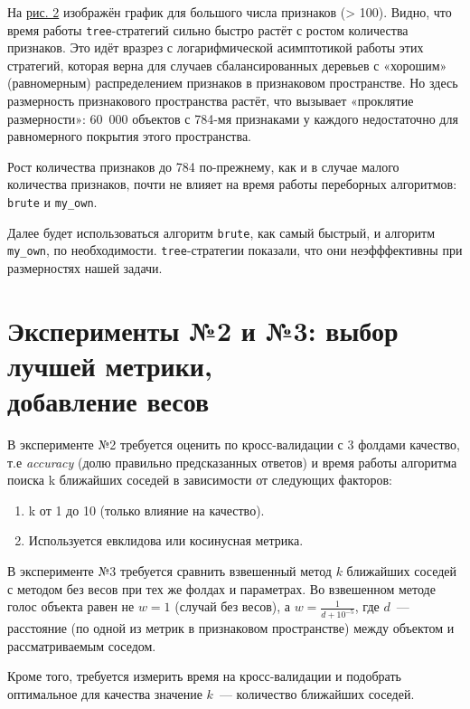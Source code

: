 \documentclass[12pt]{article}
\begin{document}
На \hyperref[fig:1_times-2]{рис. 2} изображён график для большого числа признаков (> 100). Видно, что время работы \verb|tree|-стратегий сильно быстро растёт с ростом количества признаков. Это идёт вразрез с логарифмической асимптотикой работы этих стратегий, которая верна для случаев сбалансированных деревьев с «хорошим» (равномерным) распределением признаков в признаковом пространстве. Но здесь размерность признакового пространства растёт, что вызывает «проклятие размерности»: 60~000 объектов с 784-мя признаками у каждого недостаточно для равномерного покрытия этого пространства.

Рост количества признаков до 784 по-прежнему, как и в случае малого количества признаков, почти не влияет на время работы переборных алгоритмов: \verb|brute| и \verb|my_own|.

Далее будет использоваться алгоритм \verb|brute|, как самый быстрый, и алгоритм \verb|my_own|, по необходимости. \verb|tree|-стратегии показали, что они неэфффективны при размерностях нашей задачи.

\section{Эксперименты №2 и №3: выбор лучшей метрики,\\добавление весов}
В эксперименте №2 требуется оценить по кросс-валидации с 3 фолдами качество, т.е \emph{accuracy} (долю правильно предсказанных ответов) и время
работы алгоритма поиска k ближайших соседей в зависимости от следующих факторов:
\begin{enumerate} 
    \begin{enumerate} 
        \item k от 1 до 10 (только влияние на качество).
        \item Используется евклидова или косинусная метрика.
    \end{enumerate} 
\end{enumerate}

В эксперименте №3 требуется сравнить взвешенный метод $k$ ближайших соседей с методом без весов при тех же фолдах и параметрах. Во взвешенном методе голос объекта равен не $w = 1$ (случай без весов), а $w = \frac{1}{d+10^{-5}}$, где $d$~--- расстояние (по одной из метрик в признаковом пространстве) между объектом и рассматриваемым соседом.

Кроме того, требуется измерить время на кросс-валидации и подобрать оптимальное для качества значение $k$~--- количество ближайших соседей.
\end{document}

